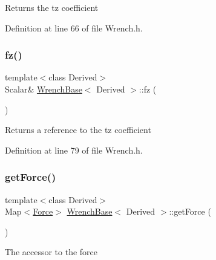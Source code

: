 \begin{DoxyReturn}{Returns}
the {\ttfamily tz} coefficient 
\end{DoxyReturn}


Definition at line 66 of file Wrench.\+h.

\hypertarget{class_wrench_base_a70511caf28052f4306021576a82690b9}{}\label{class_wrench_base_a70511caf28052f4306021576a82690b9} 
\subsubsection{\texorpdfstring{fz()}{fz()}\hspace{0.1cm}{\footnotesize\ttfamily [2/2]}}
{\footnotesize\ttfamily template$<$class Derived$>$ \\
Scalar\& \hyperlink{class_wrench_base}{Wrench\+Base}$<$ Derived $>$\+::fz (\begin{DoxyParamCaption}{ }\end{DoxyParamCaption})\hspace{0.3cm}{\ttfamily [inline]}}

\begin{DoxyReturn}{Returns}
a reference to the {\ttfamily tz} coefficient 
\end{DoxyReturn}


Definition at line 79 of file Wrench.\+h.

\hypertarget{class_wrench_base_a3c7a5e30eb3caafa7fc5d41899167f99}{}\label{class_wrench_base_a3c7a5e30eb3caafa7fc5d41899167f99} 
\subsubsection{\texorpdfstring{get\+Force()}{getForce()}\hspace{0.1cm}{\footnotesize\ttfamily [1/2]}}
{\footnotesize\ttfamily template$<$class Derived$>$ \\
Map$<$\hyperlink{class_wrench_base_aa589699bbf0d18c023a0a2fe6482b4a7}{Force}$>$ \hyperlink{class_wrench_base}{Wrench\+Base}$<$ Derived $>$\+::get\+Force (\begin{DoxyParamCaption}{ }\end{DoxyParamCaption})\hspace{0.3cm}{\ttfamily [inline]}}

The accessor to the force 

